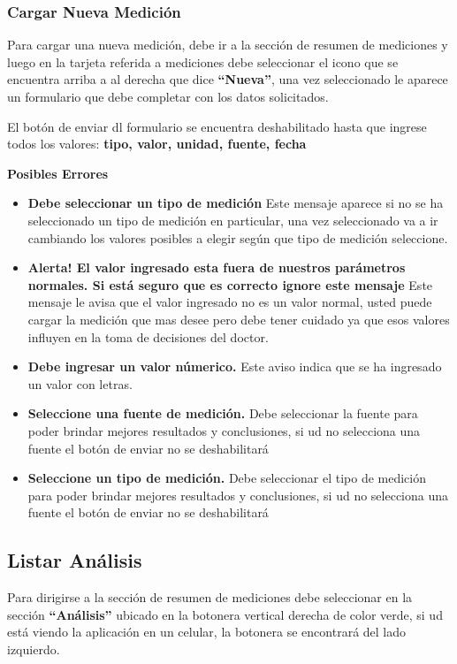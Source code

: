 \subsubsection{Cargar Nueva Medición}
Para cargar una nueva medición, debe ir a la sección de resumen de mediciones y luego en la tarjeta referida a mediciones debe seleccionar el icono que se encuentra arriba a al derecha que dice \textbf{``Nueva''}, una vez seleccionado le aparece un formulario que debe completar con los datos solicitados.

El botón de enviar dl formulario se encuentra deshabilitado hasta que ingrese todos los valores:
\textbf{tipo, valor, unidad, fuente, fecha}


\textbf{Posibles Errores}
\begin{itemize}
	\item \textbf{Debe seleccionar un tipo de medición} Este mensaje aparece si no se ha seleccionado un tipo de medición en particular, una vez seleccionado va a ir cambiando los valores posibles a elegir según que tipo de medición seleccione.
	\item \textbf{Alerta! El valor ingresado esta fuera de nuestros parámetros normales. Si está seguro que es correcto ignore este mensaje} Este mensaje le avisa que el valor ingresado no es un valor normal, usted puede cargar la medición que mas desee pero debe tener cuidado ya que esos valores influyen en la toma de decisiones del doctor.
	\item \textbf{Debe ingresar un valor númerico.} Este aviso indica que se ha ingresado un valor con letras.
	\item \textbf{Seleccione una fuente de medición.} Debe seleccionar la fuente para poder brindar mejores resultados y conclusiones, si ud no selecciona una fuente el botón de enviar no se deshabilitará
	\item \textbf{Seleccione un tipo de medición.} Debe seleccionar el tipo de medición para poder brindar mejores resultados y conclusiones, si ud no selecciona una fuente el botón de enviar no se deshabilitará
\end{itemize}


\subsection{Listar Análisis}
Para dirigirse a la sección de resumen de mediciones debe seleccionar en la sección \textbf{``Análisis''} ubicado en la botonera vertical derecha de color verde, si ud está viendo la aplicación en un celular, la botonera se encontrará del lado izquierdo.

